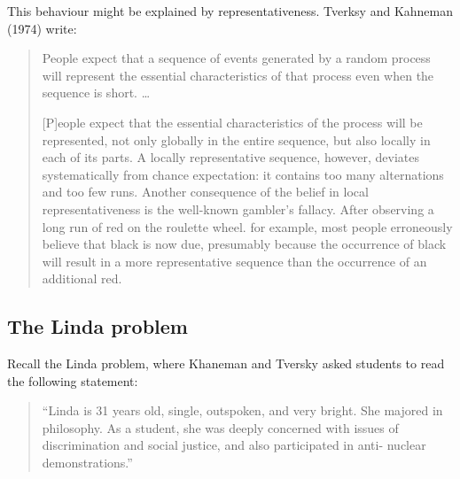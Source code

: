 \documentclass[
  letterpaper,
  DIV=11,
  numbers=noendperiod]{scrreprt}
\begin{document}
\begin{tcolorbox}[enhanced jigsaw, title=\textcolor{quarto-callout-tip-color}{\faLightbulb}\hspace{0.5em}{Answer}, toprule=.15mm, colback=white, breakable, titlerule=0mm, colframe=quarto-callout-tip-color-frame, coltitle=black, opacityback=0, rightrule=.15mm, colbacktitle=quarto-callout-tip-color!10!white, bottomtitle=1mm, opacitybacktitle=0.6, arc=.35mm, bottomrule=.15mm, toptitle=1mm, leftrule=.75mm, left=2mm]

This behaviour might be explained by representativeness. Tverksy and
Kahneman (1974) write:

\begin{quote}
People expect that a sequence of events generated by a random process
will represent the essential characteristics of that process even when
the sequence is short. \ldots{}

{[}P{]}eople expect that the essential characteristics of the process
will be represented, not only globally in the entire sequence, but also
locally in each of its parts. A locally representative sequence,
however, deviates systematically from chance expectation: it contains
too many alternations and too few runs. Another consequence of the
belief in local representativeness is the well-known gambler's fallacy.
After observing a long run of red on the roulette wheel. for example,
most people erroneously believe that black is now due, presumably
because the occurrence of black will result in a more representative
sequence than the occurrence of an additional red.
\end{quote}

\end{tcolorbox}

\hypertarget{the-linda-problem}{%
\subsection{The Linda problem}\label{the-linda-problem}}

Recall the Linda problem, where Khaneman and Tversky asked students to
read the following statement:

\begin{quote}
``Linda is 31 years old, single, outspoken, and very bright. She majored
in philosophy. As a student, she was deeply concerned with issues of
discrimination and social justice, and also participated in anti-
nuclear demonstrations.''
\end{quote}
\end{document}
